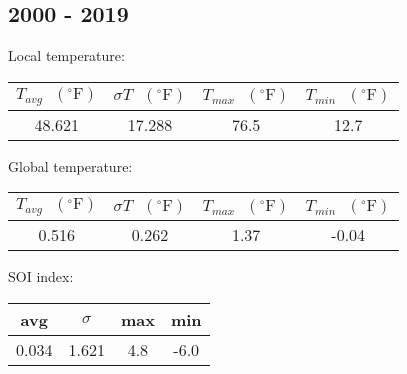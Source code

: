 \documentclass[12pt]{article}
\begin{document}
\subsection*{2000 - 2019}
Local temperature:
\begin{center}
\begin{tabular}{c | c | c | c}
	$T_{avg} \textrm{ } (^{\circ} \textrm{F})$ &
	$\sigma T \textrm{ } (^{\circ} \textrm{F})$ &
	$T_{max} \textrm{ } (^{\circ} \textrm{F})$ &
	$T_{min} \textrm{ } (^{\circ} \textrm{F})$ \\ %
	\hline
	48.621 & 17.288 & 76.5 & 12.7 \\ %
\end{tabular}
\end{center}
Global temperature:
\begin{center}
\begin{tabular}{c | c | c | c}
	$T_{avg} \textrm{ } (^{\circ} \textrm{F})$ &
	$\sigma T \textrm{ } (^{\circ} \textrm{F})$ &
	$T_{max} \textrm{ } (^{\circ} \textrm{F})$ &
	$T_{min} \textrm{ } (^{\circ} \textrm{F})$ \\ %
	\hline
	0.516 & 0.262 & 1.37 & -0.04 \\ %
\end{tabular}
\end{center}
SOI index:
\begin{center}
\begin{tabular}{c | c | c | c}
	avg & $\sigma$ & max & min \\ %
	\hline
	0.034 & 1.621 & 4.8 & -6.0 \\ %
\end{tabular}
\end{center}
\end{document}
